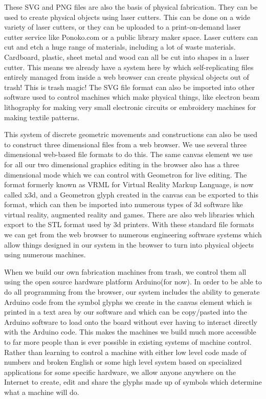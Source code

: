 These SVG and PNG files are also the basis of physical fabrication. They
can be used to create physical objects using laser cutters. This can be
done on a wide variety of laser cutters, or they can be uploaded to a
print-on-demand laser cutter service like Ponoko.com or a public library
maker space. Laser cutters can cut and etch a huge range of materials,
including a lot of waste materials. Cardboard, plastic, sheet metal and
wood can all be cut into shapes in a laser cutter. This means we already
have a system here by which self-replicating files entirely managed from
inside a web browser can create physical objects out of trash! This is
trash magic! The SVG file format can also be imported into other
software used to control machines which make physical things, like
electron beam lithography for making very small electronic circuits or
embroidery machines for making textile patterns.

This system of discrete geometric movements and constructions can also
be used to construct three dimensional files from a web browser. We use
several three dimensional web-based file formats to do this. The same
canvas element we use for all our two dimensional graphics editing in
the browser also has a three dimensional mode which we can control with
Geometron for live editing. The format formerly known as VRML for
Virtual Reality Markup Language, is now called x3d, and a Geometron
glyph created in the canvas can be exported to this format, which can
then be imported into numerous types of 3d software like virtual
reality, augmented reality and games. There are also web libraries which
export to the STL format used by 3d printers. With these standard file
formats we can get from the web browser to numerous engineering software
systems which allow things designed in our system in the browser to turn
into physical objects using numerous machines.

When we build our own fabrication machines from trash, we control them
all using the open source hardware platform Arduino(for now). In order
to be able to do all programming from the browser, our system includes
the ability to generate Arduino code from the symbol glyphs we create in
the canvas element which is printed in a text area by our software and
which can be copy/pasted into the Arduino software to load onto the
board without ever having to interact directly with the Arduino code.
This makes the machines we build much more accessible to far more people
than is ever possible in existing systems of machine control. Rather
than learning to control a machine with either low level code made of
numbers and broken English or some high level system based on
specialized applications for some specific hardware, we allow anyone
anywhere on the Internet to create, edit and share the glyphs made up of
symbols which determine what a machine will do.

